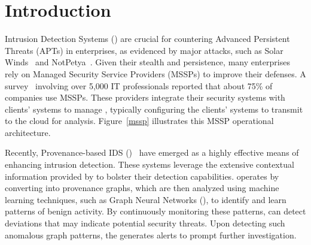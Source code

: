 \section{Introduction}
\label{s:intro}









Intrusion Detection Systems (\ids) are crucial for countering Advanced Persistent Threats (APTs) in enterprises, as evidenced by major attacks, such as Solar Winds~\cite{solarwinds} and NotPetya~\cite{notpetya}. Given their stealth and persistence, many enterprises rely on Managed Security Service Providers (MSSPs) to improve their defenses. A survey~\cite{msspsurvey} involving over 5,000 IT professionals reported that about 75\% of companies use MSSPs. These providers integrate their security systems with clients' systems to manage \logs, typically configuring the clients' systems to transmit \logs to the cloud for analysis. Figure~\ref{mssp} illustrates this MSSP operational architecture.



Recently, Provenance-based IDS (\pids)~\cite{streamspot,provdetector2020,wang2022threatrace,shadewatcher,yangprographer,han2020unicorn,jia2023magic,flash2024,cheng2023kairos,sigl} have emerged as a highly effective means of enhancing intrusion detection. These systems leverage the extensive contextual information provided by \logs to bolster their detection capabilities. \pids operates by converting \logs into provenance graphs, which are then analyzed using machine learning techniques, such as Graph Neural Networks (\gnnshort), to identify and learn patterns of benign activity. By continuously monitoring these patterns, \pids can detect deviations that may indicate potential security threats. Upon detecting such anomalous graph patterns, the \pids generates alerts to prompt further investigation.



